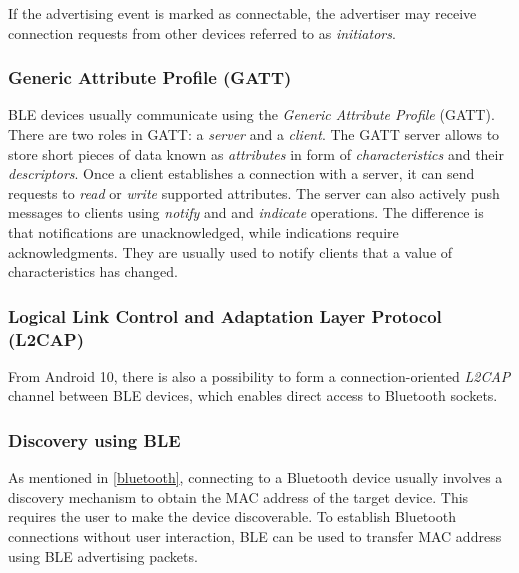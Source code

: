 \documentclass[conference,compsoc]{IEEEtran}
\begin{document}
If the advertising event is marked as connectable, the advertiser may receive connection requests from other devices referred to as \textit{initiators}.

\subsubsection{Generic Attribute Profile (GATT)}
BLE devices usually communicate using the \textit{Generic Attribute Profile} (GATT). There are two roles in GATT: a \textit{server} and a \textit{client}.
The GATT server allows to store short pieces of data known as \textit{attributes} in form of \textit{characteristics} and their \textit{descriptors}. Once a client establishes a connection with a server, it can send requests to \textit{read} or \textit{write} supported attributes. The server can also actively push messages to clients using \textit{notify} and and \textit{indicate} operations. The difference is that notifications are unacknowledged, while indications require acknowledgments. They are usually used to notify clients that a value of characteristics has changed.

\subsubsection{Logical Link Control and Adaptation Layer Protocol (L2CAP)}
From Android 10, there is also a possibility to form a connection-oriented \textit{L2CAP} channel between BLE devices, which enables direct access to Bluetooth sockets.

\subsubsection{Discovery using BLE}

As mentioned in \ref{bluetooth}, connecting to a Bluetooth device usually involves a discovery mechanism to obtain the MAC address of the target device. This requires the user to make the device discoverable. To establish Bluetooth connections without user interaction, BLE can be used to transfer MAC address using BLE advertising packets.
\end{document}
